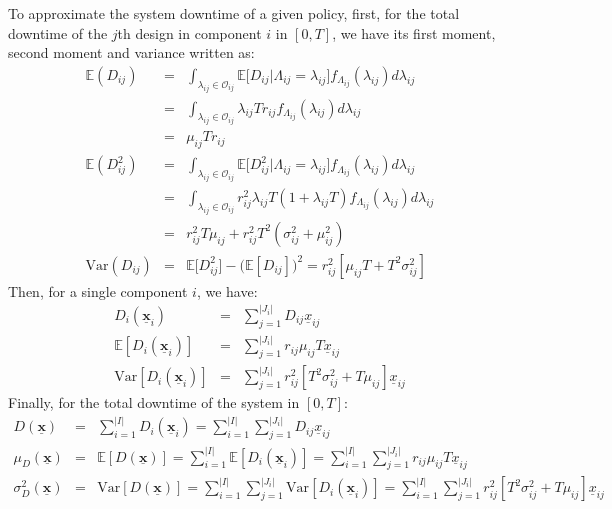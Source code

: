 \documentclass[preprint,12pt]{elsarticle}
\begin{document}
To approximate the system downtime of a given policy, first, for the total downtime of the $j$th design in component $i$ in $[0, T]$, we have its first moment, second moment and variance written as:
\small{
\begin{eqnarray}
\mathbb{E}(D_{ij}) &=& \int_{\lambda_{ij}\in \mathcal O_{ij}}\mathbb{E}\bigg[D_{ij} \bigg\vert \Lambda_{ij}=\lambda_{ij}\bigg]f_{\Lambda_{ij}}(\lambda_{ij})d\lambda_{ij} \nonumber\\
 &=& \int_{\lambda_{ij}\in \mathcal O_{ij} } \lambda_{ij}T r_{ij}f_{\Lambda_{ij}}(\lambda_{ij})d\lambda_{ij} \nonumber\\
 &=& \mu_{ij} T r_{ij}\\
\mathbb{E}(D^{2}_{ij}) &=& \int_{\lambda_{ij}\in \mathcal O_{ij}}\mathbb{E}\bigg[D^{2}_{ij} \bigg\vert \Lambda_{ij}=\lambda_{ij}\bigg]f_{\Lambda_{ij}}(\lambda_{ij})d\lambda_{ij}  \nonumber\\
&=& \int_{\lambda_{ij}\in \mathcal O_{ij}} {r^{2}_{ij}\lambda_{ij}T(1+\lambda_{ij}T)f_{\Lambda_{ij}}(\lambda_{ij})d\lambda_{ij}} \nonumber\\
&=& r^{2}_{ij}T\mu_{ij} + r^{2}_{ij}T^{2}(\sigma^{2}_{ij}+\mu^{2}_{ij}) \\
\textrm{Var}(D_{ij})&=&\mathbb{E}\bigg[D^{2}_{ij}\bigg] - \bigg(\mathbb{E}[D_{ij}]\bigg)^{2}=r^{2}_{ij}[\mu_{ij}T + T^{2}\sigma^{2}_{ij}]
\end{eqnarray}
}
Then, for a single component $i$, we have:
\small{
\begin{eqnarray}
D_{i}(\boldsymbol{\underline{x}}_{i}) &=& \sum_{j=1}^{\lvert J_{i}\rvert}{D_{ij}\underline{x}_{ij}}\\
\mathbb{E}[D_{i}(\boldsymbol{\underline{x}}_{i})] &=&\sum_{j=1}^{\lvert J_{i} \rvert}{r_{ij}\mu_{ij}T\underline{x}_{ij}} \\
\textrm{Var}[D_{i}(\boldsymbol{\underline{x}}_{i})]&=&\sum_{j=1}^{\lvert J_{i} \rvert}{r_{ij}^{2}[T^{2}\sigma^{2}_{ij}+T\mu_{ij}]\underline{x}_{ij}}
\end{eqnarray}
Finally, for the total downtime of the system in $[0, T]$:
\begin{eqnarray}
D(\boldsymbol{\underline{x}}) &=& \sum_{i=1}^{\lvert I \rvert}D_{i}(\boldsymbol{\underline{x}}_{i})
=\sum_{i=1}^{\lvert I \rvert}\sum_{j=1}^{\lvert J_{i}\rvert}{D_{ij}\underline{x}_{ij}}  \\
\mu_{D}(\boldsymbol{\underline{x}})&=&\mathbb{E}[D(\boldsymbol{\underline{x}})] = \sum^{\lvert I \rvert}_{i=1}\mathbb{E}[D_{i}(\boldsymbol{\underline{x}}_{i})] = \sum^{\lvert I \rvert}_{i=1} \sum_{j=1}^{\lvert J_{i} \rvert}{r_{ij}\mu_{ij}T\underline{x}_{ij}} \label{expdowntime}\\
\sigma^{2}_{D}(\boldsymbol{\underline{x}})&=&\textrm{Var}[D(\boldsymbol{\underline{x}})] = \sum_{i=1}^{\lvert I \rvert} \sum_{j=1}^{\lvert J_{i} \rvert}\textrm{Var}[D_{i}(\boldsymbol{\underline{x}}_{i})] = \sum_{i=1}^{\lvert I \rvert}\sum_{j=1}^{\lvert J_{i} \rvert}r_{ij}^{2}[T^{2}\sigma^{2}_{ij}+T\mu_{ij}]\underline{x}_{ij} \label{vardowntime}
\end{eqnarray}
}
\end{document}
